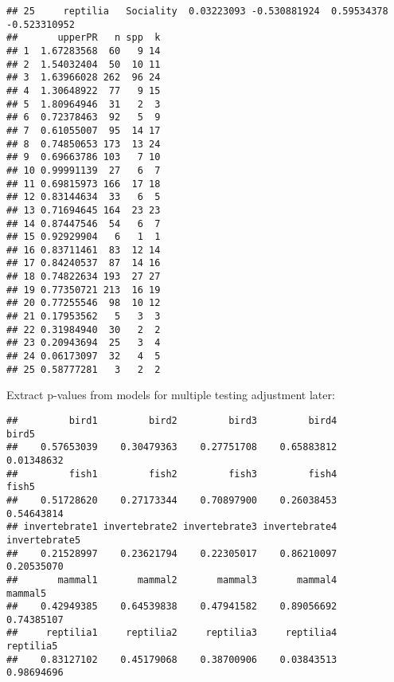 \documentclass[]{article}
\newenvironment{Shaded}{\begin{snugshade}}{\end{snugshade}}
\newcommand{\KeywordTok}[1]{\textcolor[rgb]{0.13,0.29,0.53}{\textbf{#1}}}
\newcommand{\StringTok}[1]{\textcolor[rgb]{0.31,0.60,0.02}{#1}}
\newcommand{\CommentTok}[1]{\textcolor[rgb]{0.56,0.35,0.01}{\textit{#1}}}
\newcommand{\ControlFlowTok}[1]{\textcolor[rgb]{0.13,0.29,0.53}{\textbf{#1}}}
\newcommand{\OperatorTok}[1]{\textcolor[rgb]{0.81,0.36,0.00}{\textbf{#1}}}
\newcommand{\NormalTok}[1]{#1}
\begin{document}
\begin{verbatim}
## 25     reptilia   Sociality  0.03223093 -0.530881924  0.59534378 -0.523310952
##       upperPR   n spp  k
## 1  1.67283568  60   9 14
## 2  1.54032404  50  10 11
## 3  1.63966028 262  96 24
## 4  1.30648922  77   9 15
## 5  1.80964946  31   2  3
## 6  0.72378463  92   5  9
## 7  0.61055007  95  14 17
## 8  0.74850653 173  13 24
## 9  0.69663786 103   7 10
## 10 0.99991139  27   6  7
## 11 0.69815973 166  17 18
## 12 0.83144634  33   6  5
## 13 0.71694645 164  23 23
## 14 0.87447546  54   6  7
## 15 0.92929904   6   1  1
## 16 0.83711461  83  12 14
## 17 0.84240537  87  14 16
## 18 0.74822634 193  27 27
## 19 0.77350721 213  16 19
## 20 0.77255546  98  10 12
## 21 0.17953562   5   3  3
## 22 0.31984940  30   2  2
## 23 0.20943694  25   3  4
## 24 0.06173097  32   4  5
## 25 0.58777281   3   2  2
\end{verbatim}

Extract p-values from models for multiple testing adjustment later:

\begin{Shaded}
\end{Shaded}

\begin{verbatim}
##         bird1         bird2         bird3         bird4         bird5 
##    0.57653039    0.30479363    0.27751708    0.65883812    0.01348632 
##         fish1         fish2         fish3         fish4         fish5 
##    0.51728620    0.27173344    0.70897900    0.26038453    0.54643814 
## invertebrate1 invertebrate2 invertebrate3 invertebrate4 invertebrate5 
##    0.21528997    0.23621794    0.22305017    0.86210097    0.20535070 
##       mammal1       mammal2       mammal3       mammal4       mammal5 
##    0.42949385    0.64539838    0.47941582    0.89056692    0.74385107 
##     reptilia1     reptilia2     reptilia3     reptilia4     reptilia5 
##    0.83127102    0.45179068    0.38700906    0.03843513    0.98694696
\end{verbatim}

\begin{Shaded}
\end{Shaded}
\end{document}
